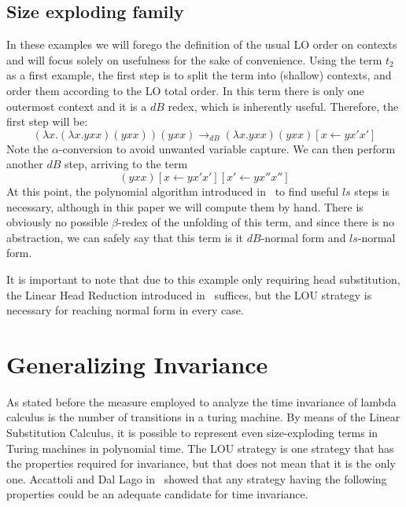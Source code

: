 \documentclass[11pt]{article}
\begin{document}
\subsection{Size exploding family}
In these examples we will forego the definition of the usual LO order on contexts and will focus solely on usefulness for the sake of convenience.
Using the term $t_2$ as a first example, the first step is to split the term into (shallow) contexts, and order them according to the LO total order. In this term there is only one outermost context and it is a $dB$ redex, which is inherently useful. Therefore, the first step will be:
\begin{equation*}
  (\lambda x . (\lambda x . yxx) (yxx))(yxx) \rightarrow_{dB} (\lambda x . yxx)(yxx)[x \leftarrow yx'x']
\end{equation*}
Note the $\alpha$-conversion to avoid unwanted variable capture.
We can then perform another $dB$ step, arriving to the term
\begin{equation*}
  (yxx)[x \leftarrow yx'x'][x' \leftarrow yx''x'']
\end{equation*}
At this point, the polynomial algorithm introduced in~\cite{beta-invariance} to find useful $ls$ steps is necessary, although in this paper we will compute them by hand. There is obviously no possible $\beta$-redex of the unfolding of this term, and since there is no abstraction, we can safely say that this term is it $dB$-normal form and $ls$-normal form.

It is important to note that due to this example only requiring head substitution, the Linear Head Reduction introduced in~\cite{invariance-of-cost-model} suffices, but the LOU strategy is necessary for reaching normal form in every case.

\section{Generalizing Invariance}
As stated before the measure employed to analyze the time invariance of lambda calculus is the number of transitions in a turing machine. By means of the Linear Substitution Calculus, it is possible to represent even size-exploding terms in Turing machines in polynomial time. The LOU strategy is one strategy that has the properties required for invariance, but that does not mean that it is the only one. Accattoli and Dal Lago in~\cite{beta-invariance} showed that any strategy having the following properties could be an adequate candidate for time invariance.
\end{document}
